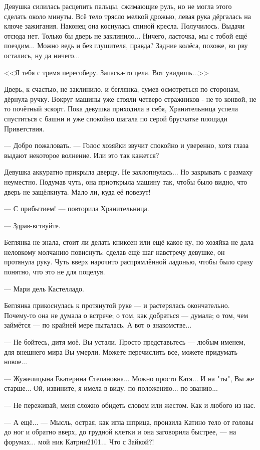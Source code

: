 Девушка силилась расцепить пальцы, сжимающие руль, но не могла этого сделать около минуты.
Всё тело трясло мелкой дрожью, левая рука дёргалась на ключе зажигания.
Наконец она коснулась спиной кресла. Получилось. Выдачи отсюда нет. Только бы дверь не заклинило...
Ничего, ласточка, мы с тобой ещё поездим... Можно ведь и без глушителя, правда?
Задние колёса, похоже, во рву остались, ну да ничего...

<<Я тебя с тремя пересоберу. Запаска-то цела. Вот увидишь...>>

Дверь, к счастью, не заклинило, и беглянка, сумев осмотреться по сторонам, дёрнула ручку.
Вокруг машины уже стояли четверо стражников - не то конвой, не то почётный эскорт.
Пока девушка приходила в себя, Хранительница успела спуститься с башни
и уже спокойно шагала по серой брусчатке площади Приветствия.

--- Добро пожаловать. --- Голос хозяйки звучит спокойно и уверенно,
хотя глаза выдают некоторое волнение. Или это так кажется?

Девушка аккуратно прикрыла дверцу. Не захлопнулась... Но закрывать с размаху неуместно.
Подумав чуть, она приоткрыла машину так, чтобы было видно, что дверь не защёлкнута. Мало ли, куда её повезут!

--- С прибытием! --- повторила Хранительница.

--- Здрав-вствуйте.

Беглянка не знала, стоит ли делать книксен или ещё какое ку, но хозяйка не дала неловкому молчанию повиснуть:
сделав ещё шаг навстречу девушке, он протянула руку.
Чуть вверх нарочито распрямлённой ладонью, чтобы было сразу понятно, что это не для поцелуя.

--- Мари дель Кастелладо.

Беглянка прикоснулась к протянутой руке --- и растерялась окончательно. Почему-то она не думала о встрече;
о том, как добраться --- думала; о том, чем займётся --- по крайней мере пыталась. А вот о знакомстве...

--- Не бойтесь, дитя моё. Вы устали. Просто представьтесь --- любым именем, для внешнего мира Вы умерли.
Можете перечислить все, можете придумать новое...

--- Жужелицына Екатерина Степановна... Можно просто Катя... И на "ты", Вы же старше...
Ой, извините, я имела в виду, по положению... по званию...

--- Не переживай, меня сложно обидеть словом или жестом. Как и любого из нас.

--- А ещё... --- Мысль, острая, как игла шприца, пронзила Катино тело от головы до ног и обратно вверх, до грудной клетки
 и она заговорила быстрее, --- на форумах... мой ник Катрин2101... Что с Зайкой?!

